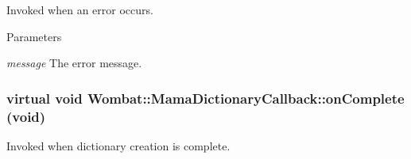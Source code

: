 Invoked when an error occurs. 
\begin{DoxyParams}{Parameters}
\item[{\em message}]The error message. \end{DoxyParams}
\hypertarget{classWombat_1_1MamaDictionaryCallback_a233a98b2d67b54037975db88ba72fabe}{
\subsubsection[{onComplete}]{\setlength{\rightskip}{0pt plus 5cm}virtual void Wombat::MamaDictionaryCallback::onComplete (void)}}
\label{classWombat_1_1MamaDictionaryCallback_a233a98b2d67b54037975db88ba72fabe}


Invoked when dictionary creation is complete. 